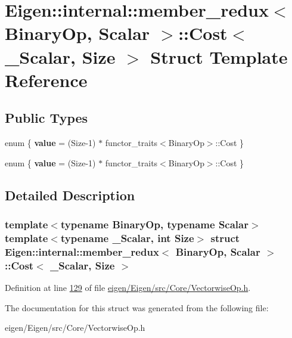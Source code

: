 \hypertarget{struct_eigen_1_1internal_1_1member__redux_1_1_cost}{}\section{Eigen\+:\+:internal\+:\+:member\+\_\+redux$<$ Binary\+Op, Scalar $>$\+:\+:Cost$<$ \+\_\+\+Scalar, Size $>$ Struct Template Reference}
\label{struct_eigen_1_1internal_1_1member__redux_1_1_cost}
\subsection*{Public Types}
\begin{DoxyCompactItemize}
\item 
\mbox{\label{struct_eigen_1_1internal_1_1member__redux_1_1_cost_a8426fb4abfbe0e7713f140f89aa52400}} 
enum \{ {\bfseries value} = (Size-\/1) $\ast$ functor\+\_\+traits$<$Binary\+Op$>$\+:\+:Cost
 \}
\item 
\mbox{\label{struct_eigen_1_1internal_1_1member__redux_1_1_cost_a12573f060b2e612dec2a2be5a81f7c5d}} 
enum \{ {\bfseries value} = (Size-\/1) $\ast$ functor\+\_\+traits$<$Binary\+Op$>$\+:\+:Cost
 \}
\end{DoxyCompactItemize}


\subsection{Detailed Description}
\subsubsection*{template$<$typename Binary\+Op, typename Scalar$>$\newline
template$<$typename \+\_\+\+Scalar, int Size$>$\newline
struct Eigen\+::internal\+::member\+\_\+redux$<$ Binary\+Op, Scalar $>$\+::\+Cost$<$ \+\_\+\+Scalar, Size $>$}



Definition at line \hyperlink{eigen_2_eigen_2src_2_core_2_vectorwise_op_8h_source_l00129}{129} of file \hyperlink{eigen_2_eigen_2src_2_core_2_vectorwise_op_8h_source}{eigen/\+Eigen/src/\+Core/\+Vectorwise\+Op.\+h}.



The documentation for this struct was generated from the following file\+:\begin{DoxyCompactItemize}
\item 
eigen/\+Eigen/src/\+Core/\+Vectorwise\+Op.\+h\end{DoxyCompactItemize}
